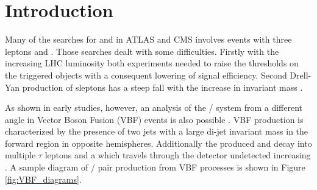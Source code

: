 \section {Introduction}

Many of the searches for \charginopm and \neutralinotwo in ATLAS \cite{Aad:2012hba, ATLAS:2012ab} and CMS \cite{Chatrchyan:2012mea} involves events with three leptons and \met. Those searches dealt with some difficulties. Firstly with the increasing LHC luminosity both experiments needed to raise the \pt thresholds on the triggered objects with a consequent lowering of signal efficiency. Second Drell-Yan production of sleptons has a steep fall with the increase in invariant mass \cite{Baer:1997nh}.

As shown in early studies, however, an analysis of the \charginopm / \neutralinotwo system from a different angle  in Vector Boson Fusion (VBF) events is also possible \cite{Bjorken:1992er}. VBF production is characterized by the presence of two jets with a large di-jet invariant mass in the forward region in opposite hemispheres. Additionally the produced \charginopm and \neutralinotwo decay into multiple $\tau$ leptons and a \neutralinoone which travels through the detector undetected increasing \met. A sample diagram of \charginopm / \neutralinotwo pair production from VBF processes is shown in Figure \ref{fig:VBF_diagrams}. 

